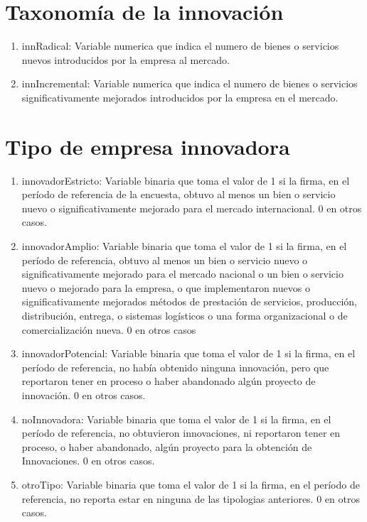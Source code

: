 \documentclass[12pt,a4paper]{article}
\begin{document}
\section{Taxonomía de la innovación}

\begin{enumerate}
	\item innRadical: Variable numerica que indica el numero de bienes o servicios nuevos introducidos por la empresa al mercado.
	\item innIncremental: Variable numerica que indica el numero de bienes o servicios significativamente mejorados introducidos por la empresa en el mercado.
\end{enumerate}

\section{Tipo de empresa innovadora}

\begin{enumerate}
	\item innovadorEstricto: Variable binaria que toma el valor de 1 si la firma, en el período de referencia de la encuesta, obtuvo al menos un bien o servicio nuevo o significativamente mejorado para el mercado internacional. 0 en otros casos.
	\item innovadorAmplio: Variable binaria que toma el valor de 1 si la firma, en el período de referencia, obtuvo al menos un bien o servicio nuevo o significativamente mejorado para el mercado nacional o un bien o servicio nuevo o mejorado para la empresa, o que implementaron nuevos o significativamente mejorados métodos de prestación de servicios, producción, distribución, entrega, o sistemas logísticos o una forma organizacional o de comercialización nueva. 0 en otros casos
	\item innovadorPotencial: Variable binaria que toma el valor de 1 si la firma, en el período de referencia, no había obtenido ninguna innovación, pero que reportaron tener en proceso o haber abandonado algún proyecto de innovación. 0 en otros casos.
	\item noInnovadora: Variable binaria que toma el valor de 1 si la firma, en el período de referencia, no obtuvieron innovaciones, ni reportaron tener en proceso, o haber abandonado, algún proyecto para la obtención de Innovaciones. 0 en otros casos.
	\item otroTipo: Variable binaria que toma el valor de 1 si la firma, en el período de referencia, no reporta estar en ninguna de las tipologias anteriores. 0 en otros casos.
\end{enumerate}
\end{document}
